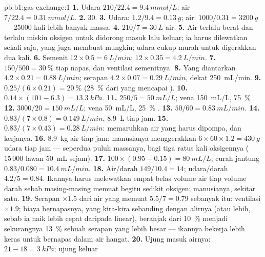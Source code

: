 \begin{solution}{pb:b1:gas-exchange:1}
\textbf{1.} Udara $210/22.4 = \qty{9.4}{mmol/L}$; air $7/22.4 =
\qty{0.31}{mmol/L}$.
\textbf{2.} 30.
\textbf{3.} Udara: $1.2/9.4 = \qty{0.13}{g}$; air: $1000/0.31 =
\qty{3200}{g}$ --- \num{25000} kali lebih banyak massa.
\textbf{4.} $210/7 = \qty{30}{L}$ air.
\textbf{5.} Air terlalu berat dan terlalu miskin oksigen untuk didorong
masuk lalu keluar; ia harus dilewatkan sekali saja, yang juga membuat
 mungkin; udara cukup murah untuk digerakkan dua kali.
\textbf{6.} Semenit $12\times 0.5 = \qty{6}{L/min}$; 
$12\times 0.35 = \qty{4.2}{L/min}$.
\textbf{7.} $150/500 = \qty{30}{\%}$ tiap napas, dan ventilasi semenitnya.
\textbf{8.} Yang diantarkan $4.2\times 0.21 = \qty{0.88}{L/min}$;
serapan $4.2\times 0.07 = \qty{0.29}{L/min}$, dekat \qty{250}{mL/min}.
\textbf{9.} $0.25/(6\times 0.21) = \qty{20}{\%}$ (\qty{28}{\%} dari yang
mencapai ).
\textbf{10.} $0.14\times(101 - 6.3) = \qty{13.3}{kPa}$.
\textbf{11.} $250/5 = \qty{50}{mL/L}$; vena \qty{150}{mL/L},
\qty{75}{\%} .
\textbf{12.} $3000/20 = \qty{150}{mL/L}$; vena \qty{50}{mL/L},
\qty{25}{\%} .
\textbf{13.} $50/60 = \qty{0.83}{mL/min}$.
\textbf{14.} $0.83/(7\times 0.8) = \qty{0.149}{L/min}$, \qty{8.9}{L}
tiap jam.
\textbf{15.} $0.83/(7\times 0.43) = \qty{0.28}{L/min}$: 
memaruhkan air yang harus dipompa, dan kerjanya.
\textbf{16.} \qty{8.9}{kg} air tiap jam; manusianya menggerakkan $6\times
60\times 1.2 = \qty{430}{g}$ udara tiap jam --- seperdua puluh
massanya, bagi tiga ratus kali oksigennya ($15\,000$ lawan
\qty{50}{mL} sejam).
\textbf{17.} $100\times(0.95 - 0.15) = \qty{80}{mL/L}$; curah jantung
$0.83/0.080 = \qty{10.4}{mL/min}$.
\textbf{18.} Air/darah $149/10.4 = 14$; udara/darah $4.2/5 = 0.84$.
Ikannya harus melewatkan empat belas volume air tiap volume darah
sebab masing-masing memuat begitu sedikit oksigen; manusianya, sekitar
satu.
\textbf{19.} Serapan $\times 1.5$ dari air yang memuat $5.5/7 = 0.79$
sebanyak itu: ventilasi $\times 1.9$; biaya bernapasnya, yang kira-kira
sebanding dengan alirnya (atau lebih, sebab ia naik lebih cepat
daripada linear), beranjak dari \qty{10}{\%} menjadi sekurangnya
\qty{13}{\%} sebuah serapan yang lebih besar --- ikannya bekerja lebih
keras untuk bernapas dalam air hangat.
\textbf{20.} Ujung masuk airnya: $21 - 18 = \qty{3}{kPa}$; ujung keluar

\end{solution}
